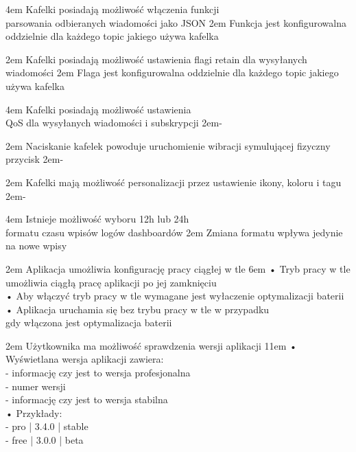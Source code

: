 {4em}{
    Kafelki posiadają możliwość włączenia funkcji\\
    parsowania odbieranych wiadomości jako JSON
}
{2em}{
    Funkcja jest konfigurowalna oddzielnie dla każdego topic jakiego używa kafelka
}

{2em}{
    Kafelki posiadają możliwość ustawienia flagi retain dla wysyłanych wiadomości
}
{2em}{
    Flaga jest konfigurowalna oddzielnie dla każdego topic jakiego używa kafelka
}

{4em}{
    Kafelki posiadają możliwość ustawienia\\
    QoS dla wysyłanych wiadomości i subskrypcji
}
{2em}{-}

{2em}{
    Naciskanie kafelek powoduje uruchomienie wibracji symulującej fizyczny przycisk
}
{2em}{-}

{2em}{
    Kafelki mają możliwość personalizacji przez ustawienie ikony, koloru i tagu
}
{2em}{-}

{4em}{
    Istnieje możliwość wyboru 12h lub 24h\\
    formatu czasu wpisów logów dashboardów
}
{2em}{
    Zmiana formatu wpływa jedynie na nowe wpisy
}

{2em}{
    Aplikacja umożliwia konfigurację pracy ciągłej w tle
}
{6em}{
    • Tryb pracy w tle umożliwia ciągłą pracę aplikacji po jej zamknięciu\\
    • Aby włączyć tryb pracy w tle wymagane jest wyłaczenie optymalizacji baterii\\
    • Aplikacja uruchamia się bez trybu pracy w tle w przypadku\\
    \hspace*{0.5em} gdy włączona jest optymalizacja baterii
}

{2em}{
    Użytkownika ma możliwość sprawdzenia wersji aplikacji
}
{11em}{
    • Wyświetlana wersja aplikacji zawiera:\\
    - informację czy jest to wersja profesjonalna\\
    - numer wersji\\
    - informację czy jest to wersja stabilna\\

    • Przykłady:\\
    - pro | 3.4.0 | stable\\
    - free | 3.0.0 | beta
}

